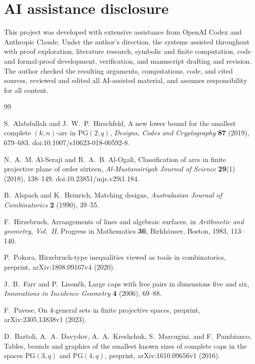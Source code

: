 \documentclass[11pt]{article}
\theoremstyle{definition}
\theoremstyle{remark}
\newcommand{\PG}{\mathrm{PG}}
\begin{document}
\section*{AI assistance disclosure}

This project was developed with extensive assistance from OpenAI Codex and
Anthropic Claude. Under the author's direction, the systems assisted
throughout with proof exploration, literature research, symbolic and finite
computation, code and formal-proof development, verification, and manuscript
drafting and revision. The author checked the resulting arguments,
computations, code, and cited sources, reviewed and edited all AI-assisted
material, and assumes responsibility for all content.

\begin{thebibliography}{99}

S.~Alabdullah and J.~W.~P.~Hirschfeld,
\newblock A new lower bound for the smallest complete $(k,n)$-arc in
$\PG(2,q)$,
\newblock \emph{Designs, Codes and Cryptography} \textbf{87} (2019), 679--683.
\newblock doi:10.1007/s10623-018-00592-8.

N.~A.~M. Al-Seraji and R.~A.~B. Al-Ogali,
\newblock Classification of arcs in finite projective plane of order sixteen,
\newblock \emph{Al-Mustansiriyah Journal of Science} \textbf{29}(1) (2018),
138--149.
\newblock doi:10.23851/mjs.v29i1.184.

B.~Alspach and K.~Heinrich,
\newblock Matching designs,
\newblock \emph{Australasian Journal of Combinatorics} \textbf{2} (1990),
39--55.

F.~Hirzebruch,
\newblock Arrangements of lines and algebraic surfaces,
\newblock in \emph{Arithmetic and geometry, Vol.~II}, Progress in
Mathematics \textbf{36}, Birkh\"auser, Boston, 1983, 113--140.

P.~Pokora,
\newblock Hirzebruch-type inequalities viewed as tools in combinatorics,
preprint, arXiv:1808.09167v4 (2020).

J.~B.~Farr and P.~Lison\v{e}k,
\newblock Large caps with free pairs in dimensions five and six,
\newblock \emph{Innovations in Incidence Geometry} \textbf{4} (2006),
69--88.

F.~Pavese,
\newblock On 4-general sets in finite projective spaces,
preprint, arXiv:2305.13838v1 (2023).

D.~Bartoli, A.~A.~Davydov, A.~A.~Kreshchuk, S.~Marcugini, and
F.~Pambianco,
\newblock Tables, bounds and graphics of the smallest known sizes of
complete caps in the spaces \(\mathrm{PG}(3,q)\) and \(\mathrm{PG}(4,q)\),
preprint, arXiv:1610.09656v1 (2016).


\end{thebibliography}
\end{document}
